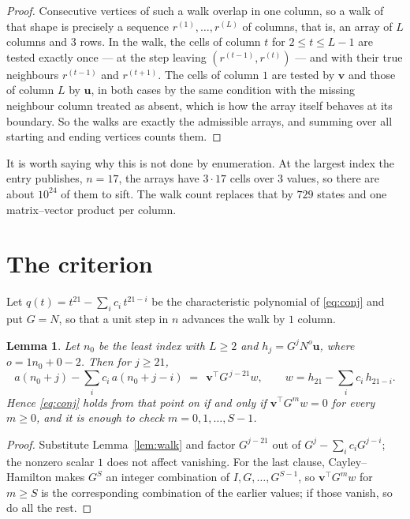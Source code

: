 \documentclass[11pt,a4paper]{article}
\theoremstyle{plain}
\newtheorem{lemma}[theorem]{Lemma}
\theoremstyle{definition}
\begin{document}
\begin{proof}
Consecutive vertices of such a walk overlap in one column, so a walk of that shape is
precisely a sequence $r^{(1)},\dots,r^{(L)}$ of columns, that is, an array of $L$ columns
and $3$ rows. In the walk, the cells of column $t$ for $2\le t\le L-1$ are tested
exactly once --- at the step leaving $(r^{(t-1)},r^{(t)})$ --- and with their true
neighbours $r^{(t-1)}$ and $r^{(t+1)}$. The cells of column $1$ are tested by
$\mathbf{v}$ and those of column $L$ by $\mathbf{u}$, in both cases by the same condition
with the missing neighbour column treated as absent, which is how the array itself behaves at
its boundary. So the walks are exactly the admissible arrays, and summing over all starting
and ending vertices counts them.
\end{proof}


It is worth saying why this is not done by enumeration. At the largest index the entry
publishes, $n=17$, the arrays have $3\cdot17$ cells over
$3$ values, so there are about $10^{24}$ of them to sift. The
walk count replaces that by $729$ states and one matrix--vector product per column.
\section{The criterion}

Let $q(t)=t^{21}-\sum_i c_i\,t^{21-i}$ be the characteristic polynomial of
\eqref{eq:conj} and put $G=N$, so that a unit step in $n$ advances the walk by
$1$ column.

\begin{lemma}\label{lem:crit}
Let $n_0$ be the least index with $L\ge2$ and $h_j=G^{j}N^{o}\mathbf{u}$, where
$o=1n_0+0-2$. Then for $j\ge21$,
\[
a(n_0+j)-\sum_i c_i\,a(n_0+j-i)\;=\;\,\mathbf{v}^{\!\top}G^{\,j-21}w,
\qquad w=h_{21}-\sum_i c_i\,h_{21-i} .
\]
Hence \eqref{eq:conj} holds from that point on if and only if
$\mathbf{v}^{\!\top}G^{m}w=0$ for every $m\ge0$, and it is enough to check
$m=0,1,\dots,S-1$.
\end{lemma}

\begin{proof}
Substitute Lemma~\ref{lem:walk} and factor $G^{j-21}$ out of
$G^{j}-\sum_ic_iG^{j-i}$; the nonzero scalar $1$ does not affect
vanishing. For the last clause, Cayley--Hamilton makes $G^{S}$ an integer combination of
$I,G,\dots,G^{S-1}$, so $\mathbf{v}^{\!\top}G^{m}w$ for $m\ge S$ is the corresponding
combination of the earlier values; if those vanish, so do all the rest.
\end{proof}
\end{document}
